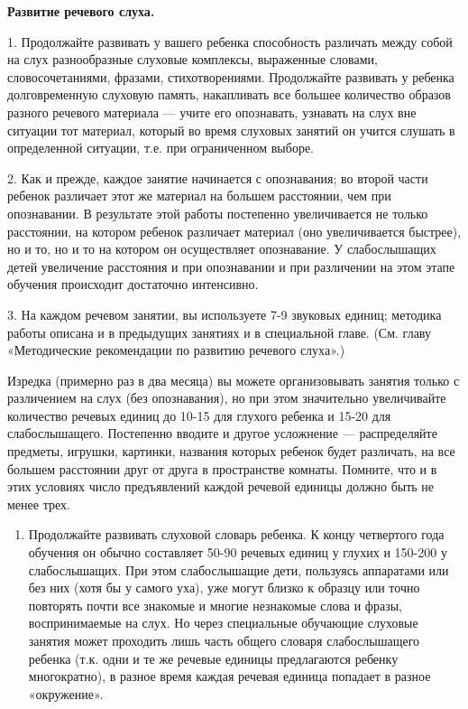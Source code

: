 \documentclass{book}
\begin{document}
\textbf{Развитие речевого слуха.}

1. Продолжайте развивать у вашего ребенка способность различать между
собой на слух разнообразные слуховые комплексы, выраженные словами,
словосочетаниями, фразами, стихотворениями. Продолжайте развивать у
ребенка долговременную слуховую память, накапливать все большее
количество образов разного речевого материала --- учите его опознавать,
узнавать на слух вне ситуации тот материал, который во время слуховых
занятий он учится слушать в определенной ситуации, т.е. при ограниченном
выборе.

2. Как и прежде, каждое занятие начинается с опознавания; во второй
части ребенок различает этот же материал на большем расстоянии, чем при
опознавании. В результате этой работы постепенно увеличивается не только
расстоянии, на котором ребенок различает материал (оно увеличивается
быстрее), но и то, но и то на котором он осуществляет опознавание. У
слабослышащих детей увеличение расстояния и при опознавании и при
различении на этом этапе обучения происходит достаточно интенсивно.

3. На каждом речевом занятии, вы используете 7-9 звуковых единиц;
методика работы описана и в предыдущих занятиях и в специальной главе.
(См. главу «Методические рекомендации по развитию речевого слуха».)

Изредка (примерно раз в два месяца) вы можете организовывать занятия
только с различением на слух (без опознавания), но при этом значительно
увеличивайте количество речевых единиц до 10-15 для глухого ребенка и
15-20 для слабослышащего. Постепенно вводите и другое усложнение ---
распределяйте предметы, игрушки, картинки, названия которых ребенок
будет различать, на все большем расстоянии друг от друга в пространстве
комнаты. Помните, что и в этих условиях число предъявлений каждой
речевой единицы должно быть не менее трех.


\begin{enumerate}
\def\labelenumi{\arabic{enumi}.}
\setcounter{enumi}{3}
\item
  
  Продолжайте развивать слуховой словарь ребенка. К концу четвертого
  года обучения он обычно составляет 50-90 речевых единиц у глухих и
  150-200 у слабослышащих. При этом слабослышащие дети, пользуясь
  аппаратами или без них (хотя бы у самого уха), уже могут близко к
  образцу или точно повторять почти все знакомые и многие незнакомые
  слова и фразы, воспринимаемые на слух. Но через специальные обучающие
  слуховые занятия может проходить лишь часть общего словаря
  слабослышащего ребенка (т.к. одни и те же речевые единицы предлагаются
  ребенку многократно), в разное время каждая речевая единица попадает в
  разное «окружение».
  
\end{enumerate}
\end{document}
